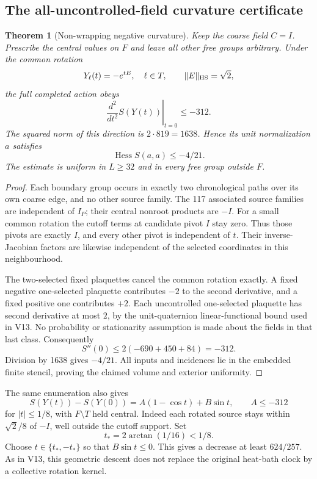 \documentclass[11pt,oneside]{article}
\newtheorem{theorem}{Theorem}[section]
\begin{document}
\subsection{The all-uncontrolled-field curvature certificate}

\begin{theorem}[Non-wrapping negative curvature]
\label{thm:f13v14-curvature}
Keep the coarse field \(C=I\). Prescribe the
central values on \(F\) and leave all other
free groups arbitrary. Under the common
rotation
\[
                     Y_\ell(t)=-e^{tE},\quad \ell\in T,
                    \qquad \|E\|_{\rm HS}=\sqrt2,
\]
the full completed action obeys
\[
                  \left.\frac{d^2}{dt^2}S(Y(t))\right|_{t=0}
                                    \le-312 .
\]
The squared norm of this direction is
\(2\cdot819=1638\). Hence its unit
normalization \(a\) satisfies
\begin{equation}\label{eq:f13v14-curvature}
                        \operatorname{Hess}S(a,a)\le-4/21.
\end{equation}
The estimate is uniform in \(L\ge32\)
and in every free group outside \(F\).
\end{theorem}

\begin{proof}
Each boundary group occurs in exactly two
chronological paths over its own coarse
edge, and no other source family.
The 117 associated source families are
independent of \(I_P\); their central
nonroot products are \(-I\). For a small
common rotation the cutoff terms at
candidate pivot \(I\) stay zero. Thus
those pivots are exactly \(I\), and every
other pivot is independent of \(t\).
Their inverse-Jacobian factors are
likewise independent of the selected
coordinates in this neighbourhood.

The two-selected fixed plaquettes cancel
the common rotation exactly. A fixed
negative one-selected plaquette contributes
\(-2\) to the second derivative, and a
fixed positive one contributes \(+2\).
Each uncontrolled one-selected plaquette
has second derivative at most \(2\), by
the unit-quaternion linear-functional
bound used in V13. No probability or
stationarity assumption is made about
the fields in that last class.
Consequently
\[
 S''(0)\le 2(-690+450+84)=-312 .
\]
Division by 1638 gives \(-4/21\).
All inputs and incidences lie in the
embedded finite stencil, proving the
claimed volume and exterior uniformity.
\end{proof}

The same enumeration also gives
\[
 S(Y(t))-S(Y(0))=A(1-\cos t)+B\sin t,\qquad A\le-312
\]
for \(|t|\le1/8\), with
\(F\setminus T\) held central.
Indeed each rotated source stays
within \(\sqrt2/8\) of \(-I\),
well outside the cutoff support.
Set
\[
                 t_* = 2\arctan(1/16)<1/8.
\]
Choose \(t\in\{t_*,-t_*\}\) so that
\(B\sin t\le0\). This gives a decrease
at least \(624/257\). As in V13, this
geometric descent does not replace the
original heat-bath clock by a collective
rotation kernel.
\end{document}
